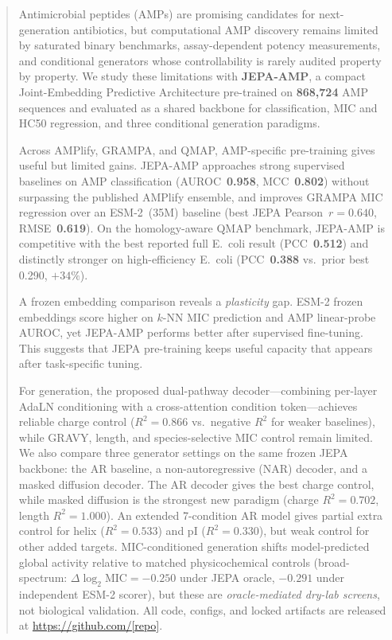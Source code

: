 \begin{abstract}
Antimicrobial peptides (AMPs) are promising candidates for next-generation
antibiotics, but computational AMP discovery remains limited by saturated
binary benchmarks, assay-dependent potency measurements, and conditional
generators whose controllability is rarely audited property by property.
We study these limitations with \textbf{JEPA-AMP}, a compact
Joint-Embedding Predictive Architecture pre-trained on \textbf{868{,}724}
AMP sequences and evaluated as a shared backbone for classification,
MIC and HC50 regression, and three conditional generation paradigms.

Across AMPlify, GRAMPA, and QMAP, AMP-specific pre-training gives useful but
limited gains.
JEPA-AMP approaches strong supervised baselines on AMP classification
(AUROC~\textbf{0.958}, MCC~\textbf{0.802}) without surpassing the published
AMPlify ensemble, and improves GRAMPA MIC regression over an ESM-2~(35M)
baseline (best JEPA Pearson~$r{=}\mathbf{0.640}$, RMSE~\textbf{0.619}).
On the homology-aware QMAP benchmark, JEPA-AMP is competitive with the
best reported full E.~coli result (PCC~\textbf{0.512}) and distinctly stronger
on high-efficiency E.~coli (PCC~\textbf{0.388} vs.\ prior best 0.290, $+34\%$).

A frozen embedding comparison reveals a \emph{plasticity} gap.
ESM-2 frozen embeddings score higher on $k$-NN MIC prediction and
AMP linear-probe AUROC, yet JEPA-AMP performs better after supervised
fine-tuning. This suggests that JEPA pre-training keeps useful capacity
that appears after task-specific tuning.

For generation, the proposed dual-pathway decoder---combining per-layer AdaLN
conditioning with a cross-attention condition token---achieves reliable charge
control ($R^2{=}\mathbf{0.866}$ vs.\ negative $R^2$ for weaker baselines),
while GRAVY, length, and species-selective MIC control remain limited.
We also compare three generator settings on the same frozen JEPA backbone:
the AR baseline, a non-autoregressive (NAR) decoder, and a masked diffusion
decoder. The AR decoder gives the best charge control, while masked diffusion
is the strongest new paradigm (charge $R^2{=}0.702$, length $R^2{=}1.000$).
An extended 7-condition AR model gives partial extra control for helix
($R^2{=}0.533$) and pI ($R^2{=}0.330$), but weak control for other added targets.
MIC-conditioned generation shifts model-predicted global activity relative to
matched physicochemical controls (broad-spectrum:
$\Delta\log_2\text{MIC}{=}{-}0.250$ under JEPA oracle, $-0.291$ under
independent ESM-2 scorer), but these are \emph{oracle-mediated dry-lab screens},
not biological validation.
All code, configs, and locked artifacts are released at
\url{https://github.com/[repo]}.
\end{abstract}
